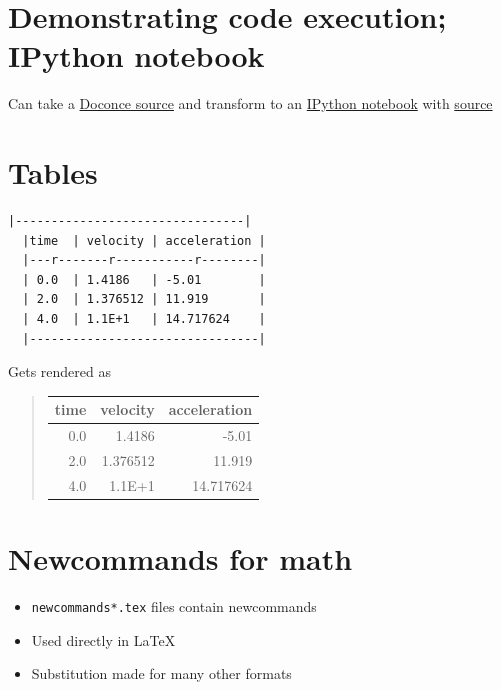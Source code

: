 \documentclass[%
twoside,                 %
final,                   %
chapterprefix=true,      %
open=right               %
10pt]{book}
\begin{document}
\section*{Demonstrating code execution; IPython notebook}
\label{slide:ipynb}

Can take a \href{{http://hplgit.github.com/teamods/writing_reports/_static/report.do.txt.html}}{Doconce source} and transform to an \href{{http://nbviewer.ipython.org/url/hplgit.github.com/teamods/writing_reports/_static/report.ipynb}}{IPython notebook} with \href{{http://hplgit.github.com/teamods/writing_reports/_static/report.ipynb.html}}{source}

\section*{Tables}

\begin{Verbatim}[numbers=none,fontsize=\fontsize{9pt}{9pt},baselinestretch=0.95]
  |--------------------------------|
  |time  | velocity | acceleration |
  |---r-------r-----------r--------|
  | 0.0  | 1.4186   | -5.01        |
  | 2.0  | 1.376512 | 11.919       |
  | 4.0  | 1.1E+1   | 14.717624    |
  |--------------------------------|
\end{Verbatim}
Gets rendered as


\begin{quote}\begin{tabular}{rrr}
\hline
\multicolumn{1}{c}{ time } & \multicolumn{1}{c}{ velocity } & \multicolumn{1}{c}{ acceleration } \\
\hline
0.0          & 1.4186       & -5.01        \\
2.0          & 1.376512     & 11.919       \\
4.0          & 1.1E+1       & 14.717624    \\
\hline
\end{tabular}\end{quote}

\noindent

\section*{Newcommands for math}

\begin{itemize}
 \item \Verb!newcommands*.tex! files contain newcommands

 \item Used directly in {\LaTeX}

 \item Substitution made for many other formats
\end{itemize}
\end{document}
